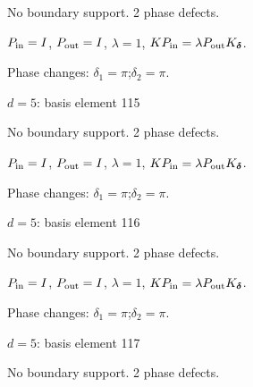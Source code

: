 No boundary support. 2 phase defects.
\begin{center}
\end{center}
\vspace{-1mm}
$P_{\rm in}=I$, \quad $P_{\rm out}=I$, \quad $\lambda=1$, \qquad $K P_{\rm in}=\lambda P_{\rm out}K_{\boldsymbol\delta}$.
\par\smallskip\begin{minipage}{.98\linewidth}\small Phase changes: $\delta_{1}=\pi$;\quad $\delta_{2}=\pi$.\end{minipage}
\vfill
{\footnotesize\texttt{}}
\newpage
{}
{\Large $d=5$: basis element 115}\par
No boundary support. 2 phase defects.
\begin{center}
\end{center}
\vspace{-1mm}
$P_{\rm in}=I$, \quad $P_{\rm out}=I$, \quad $\lambda=1$, \qquad $K P_{\rm in}=\lambda P_{\rm out}K_{\boldsymbol\delta}$.
\par\smallskip\begin{minipage}{.98\linewidth}\small Phase changes: $\delta_{1}=\pi$;\quad $\delta_{2}=\pi$.\end{minipage}
\vfill
{\footnotesize\texttt{}}
\newpage
{}
{\Large $d=5$: basis element 116}\par
No boundary support. 2 phase defects.
\begin{center}
\end{center}
\vspace{-1mm}
$P_{\rm in}=I$, \quad $P_{\rm out}=I$, \quad $\lambda=1$, \qquad $K P_{\rm in}=\lambda P_{\rm out}K_{\boldsymbol\delta}$.
\par\smallskip\begin{minipage}{.98\linewidth}\small Phase changes: $\delta_{1}=\pi$;\quad $\delta_{2}=\pi$.\end{minipage}
\vfill
{\footnotesize\texttt{}}
\newpage
{}
{\Large $d=5$: basis element 117}\par
No boundary support. 2 phase defects.
\begin{center}
\end{center}
